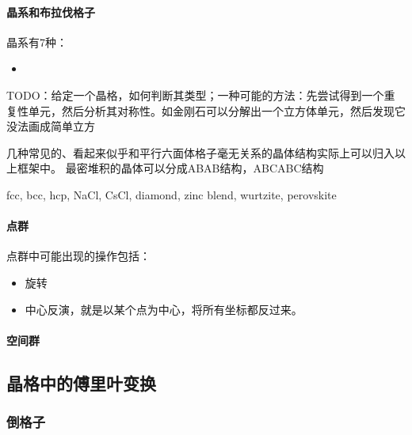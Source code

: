 \documentclass[hyperref, UTF8, a4paper]{ctexart}
\begin{document}
\paragraph{晶系和布拉伐格子} 晶系有7种：
\begin{itemize}
    \item 
\end{itemize}

TODO：给定一个晶格，如何判断其类型；一种可能的方法：先尝试得到一个重复性单元，然后分析其对称性。如金刚石可以分解出一个立方体单元，然后发现它没法画成简单立方

几种常见的、看起来似乎和平行六面体格子毫无关系的晶体结构实际上可以归入以上框架中。
最密堆积的晶体可以分成ABAB结构，ABCABC结构

fcc, bcc, hcp, NaCl, CsCl, diamond, zinc blend, wurtzite, perovskite

\paragraph{点群} 点群中可能出现的操作包括：
\begin{itemize}
    \item 旋转
    \item 中心反演，就是以某个点为中心，将所有坐标都反过来。
\end{itemize}

\paragraph{空间群} 

\subsection{晶格中的傅里叶变换}

\subsubsection{倒格子}
\end{document}
